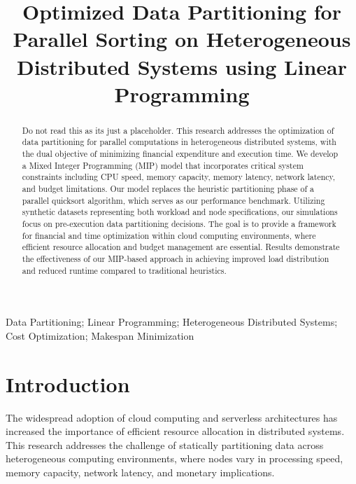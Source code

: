 \documentclass[]{interact}
\theoremstyle{plain}
\theoremstyle{definition}
\theoremstyle{remark}
\begin{document}

\title{Optimized Data Partitioning for Parallel Sorting on Heterogeneous Distributed Systems using Linear Programming}

\author{
}

\maketitle

\begin{abstract}
Do not read this as its just a placeholder. This research addresses the optimization of data partitioning for parallel computations in heterogeneous distributed systems, with the dual objective of minimizing financial expenditure and execution time. We develop a Mixed Integer Programming (MIP) model that incorporates critical system constraints including CPU speed, memory capacity, memory latency, network latency, and budget limitations. Our model replaces the heuristic partitioning phase of a parallel quicksort algorithm, which serves as our performance benchmark. Utilizing synthetic datasets representing both workload and node specifications, our simulations focus on pre-execution data partitioning decisions. The goal is to provide a framework for financial and time optimization within cloud computing environments, where efficient resource allocation and budget management are essential. Results demonstrate the effectiveness of our MIP-based approach in achieving improved load distribution and reduced runtime compared to traditional heuristics.
\end{abstract}

\begin{keywords}
Data Partitioning; Linear Programming; Heterogeneous Distributed Systems; Cost Optimization; Makespan Minimization
\end{keywords}

\section{Introduction}

The widespread adoption of cloud computing and serverless architectures has increased the importance of efficient resource allocation in distributed systems. This research addresses the challenge of statically partitioning data across heterogeneous computing environments, where nodes vary in processing speed, memory capacity, network latency, and monetary implications.
\end{document}
